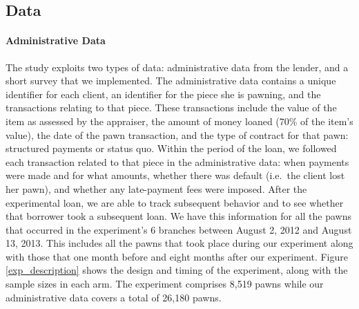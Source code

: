 \documentclass[12pt, a4paper]{article}
\begin{document}
\subsection{Data}

\paragraph*{Administrative Data}
The study exploits two types of data: administrative data from the lender, and a short survey that we implemented. The administrative data contains a unique identifier for each client, an identifier for the piece she is pawning, and the transactions relating to that piece. These transactions include the value of the item as assessed by the appraiser, the amount of money loaned (70\% of the item's value), the date of the pawn transaction, and the type of contract for that pawn: structured payments or status quo. Within the period of the loan, we followed each transaction related to that piece in the administrative data: when payments were made and for what amounts, whether there was default (i.e.\ the client lost her pawn), and whether any late-payment fees were imposed. After the experimental loan, we are able to track subsequent behavior and to see whether that borrower took a subsequent loan.  We have this information for all the pawns that occurred in the experiment's 6 branches between August 2, 2012 and August 13, 2013. This includes all the pawns that took place during our experiment along with those that one month before and eight months after our experiment. Figure \ref{exp_description} shows the design and timing of the experiment, along with the sample sizes in each arm. The experiment comprises 8,519 pawns while our administrative data covers a total of 26,180 pawns.

\end{document}
